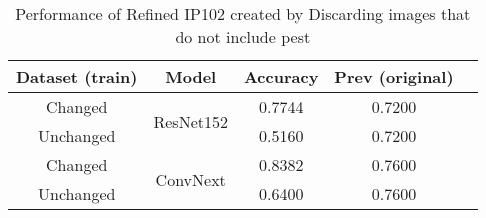 \begin{table}[!htbp]
\centering
\begin{tabular}{|c|c|c|c|c|}
\hline
\textbf{Dataset (train)} & \textbf{Model} & \textbf{Accuracy} & \textbf{Prev (original)}\\
\hline
Changed & \multirow{2}{5em}{ResNet152} & 0.7744 & 0.7200\\\cline{1-1} \cline{3-4}
Unchanged & & 0.5160 & 0.7200\\\cline{1-4}
Changed & \multirow{2}{5em}{ConvNext} & 0.8382 & 0.7600 \\\cline{1-1} \cline{3-4}
Unchanged & & 0.6400 & 0.7600\\
\hline
\end{tabular}
\caption{Performance of Refined IP102 created by Discarding images that do not include pest }
\end{table}